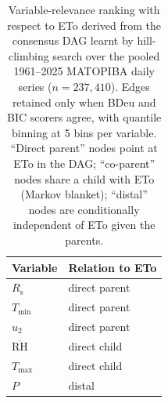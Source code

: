 \begin{table}[t]
\centering
\caption{Variable-relevance ranking with respect to ETo derived from the consensus DAG learnt by hill-climbing search over the pooled 1961--2025 MATOPIBA daily series ($n=237,410$). Edges retained only when BDeu \citep{Buntine1991} and BIC \citep{Schwarz1978} scorers agree, with quantile binning at 5 bins per variable. ``Direct parent'' nodes point at ETo in the DAG; ``co-parent'' nodes share a child with ETo (Markov blanket); ``distal'' nodes are conditionally independent of ETo given the parents.}
\label{tab:dag-relevance}
\begin{tabular}{ll}
\toprule
Variable & Relation to ETo \\
\midrule
$R_{\mathrm{s}}$ & direct parent \\
$T_{\mathrm{min}}$ & direct parent \\
$u_2$ & direct parent \\
$\overline{\mathrm{RH}}$ & direct child \\
$T_{\mathrm{max}}$ & direct child \\
$P$ & distal \\
\bottomrule
\end{tabular}
\end{table}